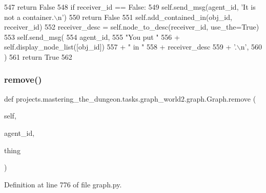 \begin{DoxyCode}
547             \textcolor{keywordflow}{return} \textcolor{keyword}{False}
548         \textcolor{keywordflow}{if} receiver\_id == \textcolor{keyword}{False}:
549             self.send\_msg(agent\_id, \textcolor{stringliteral}{'It is not a container.\(\backslash\)n'})
550             \textcolor{keywordflow}{return} \textcolor{keyword}{False}
551         self.add\_contained\_in(obj\_id, receiver\_id)
552         receiver\_desc = self.node\_to\_desc(receiver\_id, use\_the=\textcolor{keyword}{True})
553         self.send\_msg(
554             agent\_id,
555             \textcolor{stringliteral}{"You put "}
556             + self.display\_node\_list([obj\_id])
557             + \textcolor{stringliteral}{" in "}
558             + receiver\_desc
559             + \textcolor{stringliteral}{'.\(\backslash\)n'},
560         )
561         \textcolor{keywordflow}{return} \textcolor{keyword}{True}
562 
\end{DoxyCode}
\mbox{\label{classprojects_1_1mastering__the__dungeon_1_1tasks_1_1graph__world2_1_1graph_1_1Graph_a0d81485443eb223640c8bd5bc158ae32}} 
\subsubsection{\texorpdfstring{remove()}{remove()}}
{\footnotesize\ttfamily def projects.\+mastering\+\_\+the\+\_\+dungeon.\+tasks.\+graph\+\_\+world2.\+graph.\+Graph.\+remove (\begin{DoxyParamCaption}\item[{}]{self,  }\item[{}]{agent\+\_\+id,  }\item[{}]{thing }\end{DoxyParamCaption})}



Definition at line 776 of file graph.\+py.



